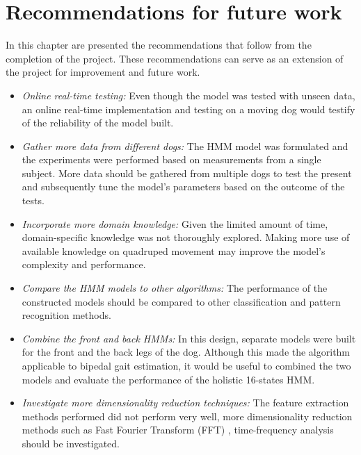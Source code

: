 \chapter{Recommendations for future work}
In this chapter are presented the recommendations that follow from the completion of the project. These recommendations can serve as an extension of the project for improvement and future work.
\begin{itemize}
	\item \textit{Online real-time testing:} Even though the model was tested with unseen data, an online real-time implementation and testing on a moving dog would testify of the reliability of the model built.
	
	\item \textit{Gather more data from different dogs:} The HMM model was formulated and the experiments were performed based on measurements from a single subject. More data should be gathered from multiple dogs to test the present and subsequently tune the model's parameters based on the outcome of the tests.
	
	\item \textit{Incorporate more domain knowledge:} Given the limited amount of time, domain-specific knowledge was not thoroughly explored. Making more use of available knowledge on quadruped movement may improve the model's complexity and performance. 
	
	\item \textit{Compare the HMM models to other algorithms:} The performance of the constructed models should be compared to other classification and pattern recognition methods.
	
	\item \textit{Combine the front and back HMMs:} In this design, separate models were built for the front and the back legs of the dog. Although this made the algorithm applicable to bipedal gait estimation, it would be useful to combined the two models and evaluate the performance of the holistic 16-states HMM.
	
	\item \textit{Investigate more dimensionality reduction techniques:} The feature extraction methods performed did not perform very well, more dimensionality reduction methods such as Fast Fourier Transform (FFT) \cite{towa2009}, time-frequency analysis \cite{ches2012} should be investigated.
\end{itemize}
